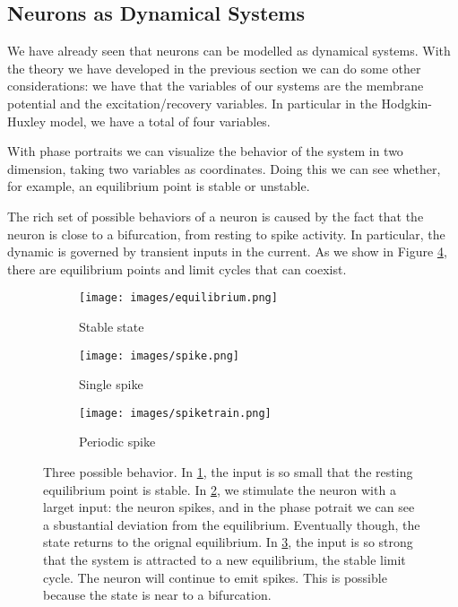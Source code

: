 \documentclass[oneside]{book}
\theoremstyle{definition}
\theoremstyle{plain}
\begin{document}
\subsection{Neurons as Dynamical Systems}
We have already seen that neurons can be modelled as dynamical systems. With the theory we have developed in the previous section we can do some other considerations:
we have that the variables of our systems are the membrane potential and the excitation/recovery variables. In particular in the Hodgkin-Huxley model, we have a total of four variables.

With phase portraits we can visualize the behavior of the system in two dimension, taking two variables as coordinates. Doing this we can see whether, for example, an equilibrium point is stable or unstable. 

The rich set of possible behaviors of a neuron is caused by the fact that the neuron is close to a bifurcation, from resting to spike activity. In particular, the dynamic is governed by transient inputs in the current. As we show in Figure \ref{fig:neuron_portrait}, there are equilibrium points and limit cycles that can coexist.
\begin{figure}
    \centering
    \begin{subfigure}{0.3\textwidth}
        \texttt{[image: images/equilibrium.png]}
        \caption{Stable state}
        \label{fig:stable}
    \end{subfigure}
    \begin{subfigure}{0.3\textwidth}
        \texttt{[image: images/spike.png]}
        \caption{Single spike}
        \label{fig:one_spike}
    \end{subfigure}
    \begin{subfigure}{0.3\textwidth}
    \texttt{[image: images/spiketrain.png]}
        \caption{Periodic spike}
        \label{fig:periodic_spike}
    \end{subfigure}
    \caption{Three possible behavior. In \ref{fig:stable}, the input is so small that the resting equilibrium point is stable. In \ref{fig:one_spike}, we stimulate the neuron  with a larget input: the neuron spikes, and in the phase potrait we can see a sbustantial deviation from the equilibrium. Eventually though, the state returns to the orignal equilibrium. In \ref{fig:periodic_spike}, the input is so strong that the system is attracted to a new equilibrium, the stable limit cycle. The neuron will continue to emit spikes. This is possible because the state is near to a bifurcation.}
    \label{fig:neuron_portrait}
\end{figure}
\end{document}
